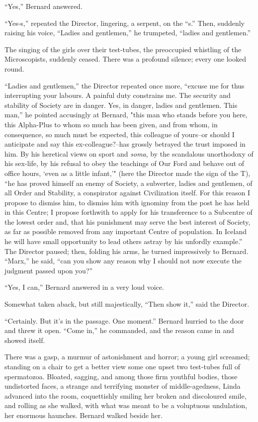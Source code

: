 \documentclass[12pt]{report}
\begin{document}
``Yes,'' Bernard answered.

``Yes-s,'' repeated the Director, lingering, a serpent, on the ``s.''
Then, suddenly raising his voice, ``Ladies and gentlemen,'' he
trumpeted, ``ladies and gentlemen.''

The singing of the girls over their test-tubes, the preoccupied
whistling of the Microscopists, suddenly ceased. There was a profound
silence; every one looked round.

``Ladies and gentlemen,'' the Director repeated once more, ``excuse me
for thus interrupting your labours. A painful duty constrains me. The
security and stability of Society are in danger. Yes, in danger, ladies
and gentlemen. This man,'' he pointed accusingly at Bernard, "this man
who stands before you here, this Alpha-Plus to whom so much has been
given, and from whom, in consequence, so much must be expected, this
colleague of yours--or should I anticipate and say this
ex-colleague?--has grossly betrayed the trust imposed in him. By his
heretical views on sport and \emph{soma}, by the scandalous unorthodoxy
of his sex-life, by his refusal to obey the teachings of Our Ford and
behave out of office hours, `even as a little infant,'" (here the
Director made the sign of the T), ``he has proved himself an enemy of
Society, a subverter, ladies and gentlemen, of all Order and Stability,
a conspirator against Civilization itself. For this reason I propose to
dismiss him, to dismiss him with ignominy from the post he has held in
this Centre; I propose forthwith to apply for his transference to a
Subcentre of the lowest order and, that his punishment may serve the
best interest of Society, as far as possible removed from any important
Centre of population. In Iceland he will have small opportunity to lead
others astray by his unfordly example.'' The Director paused; then,
folding his arms, he turned impressively to Bernard. ``Marx,'' he said,
``can you show any reason why I should not now execute the judgment
passed upon you?''

``Yes, I can,'' Bernard answered in a very loud voice.

Somewhat taken aback, but still majestically, ``Then show it,'' said the
Director.

``Certainly. But it's in the passage. One moment.'' Bernard hurried to
the door and threw it open. ``Come in,'' he commanded, and the reason
came in and showed itself.

There was a gasp, a murmur of astonishment and horror; a young girl
screamed; standing on a chair to get a better view some one upset two
test-tubes full of spermatozoa. Bloated, sagging, and among those firm
youthful bodies, those undistorted faces, a strange and terrifying
monster of middle-agedness, Linda advanced into the room, coquettishly
smiling her broken and discoloured smile, and rolling as she walked,
with what was meant to be a voluptuous undulation, her enormous
haunches. Bernard walked beside her.
\end{document}
